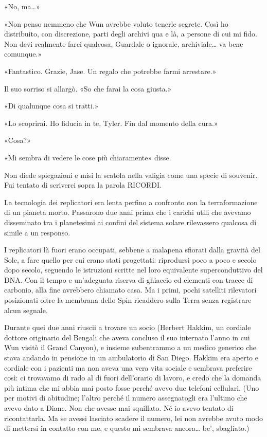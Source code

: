 «No, ma\ldots»

«Non penso nemmeno che Wun avrebbe voluto tenerle segrete. Così ho
distribuito, con discrezione, parti degli archivi qua e là, a persone di
cui mi fido. Non devi realmente farci qualcosa. Guardale o ignorale,
archiviale\ldots{} va bene comunque.»

«Fantastico. Grazie, Jase. Un regalo che potrebbe farmi arrestare.»

Il suo sorriso si allargò. «So che farai la cosa giusta.»

«Di qualunque cosa si tratti.»

«Lo scoprirai. Ho fiducia in te, Tyler. Fin dal momento della cura.»

«Cosa?»

«Mi sembra di vedere le cose più chiaramente» disse.

Non diede spiegazioni e misi la scatola nella valigia come una specie di
souvenir. Fui tentato di scriverci sopra la parola {RICORDI}.

\separatorefiori

La tecnologia dei replicatori era lenta perfino a confronto con la
terraformazione di un pianeta morto. Passarono due anni prima che i
carichi utili che avevamo disseminato tra i planetesimi ai confini del
sistema solare rilevassero qualcosa di simile a un responso.

I replicatori là fuori erano occupati, sebbene a malapena sfiorati dalla
gravità del Sole, a fare quello per cui erano stati progettati:
riprodursi poco a poco e secolo dopo secolo, seguendo le istruzioni
scritte nel loro equivalente superconduttivo del DNA. Con il tempo e
un'adeguata riserva di ghiaccio ed elementi con tracce di carbonio, alla
fine avrebbero chiamato casa. Ma i primi, pochi satelliti rilevatori
posizionati oltre la membrana dello Spin ricaddero sulla Terra senza
registrare alcun segnale.

Durante quei due anni riuscii a trovare un socio (Herbert Hakkim, un
cordiale dottore originario del Bengali che aveva concluso il suo
internato l'anno in cui Wun visitò il Grand Canyon), e insieme
subentrammo a un medico generico che stava andando in pensione in un
ambulatorio di San Diego. Hakkim era aperto e cordiale con i pazienti ma
non aveva una vera vita sociale e sembrava preferire così: ci trovavamo
di rado al di fuori dell'orario di lavoro, e credo che la domanda più
intima che mi abbia mai posto fosse perché avevo due telefoni cellulari.
(Uno per motivi di abitudine; l'altro perché il numero assegnatogli era
l'ultimo che avevo dato a Diane. Non che avesse mai squillato. Né io
avevo tentato di ricontattarla. Ma se avessi lasciato scadere il numero,
lei non avrebbe avuto modo di mettersi in contatto con me, e questo mi
sembrava ancora\ldots{} be', sbagliato.)

